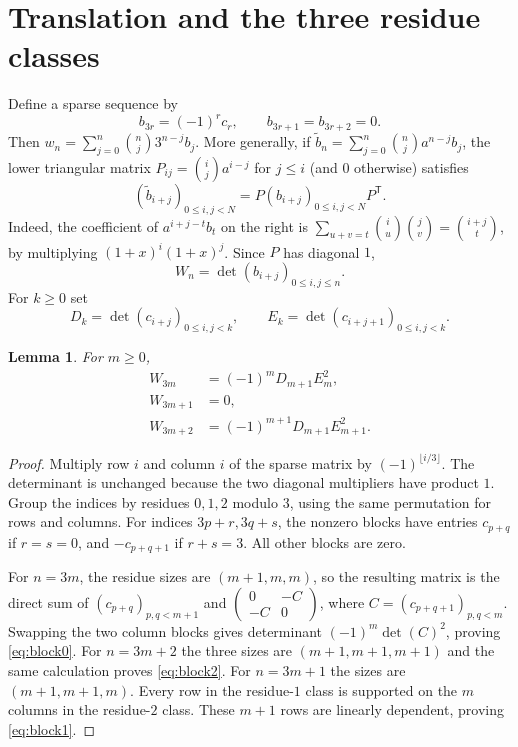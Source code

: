 \documentclass[11pt]{article}
\newtheorem{lemma}[theorem]{Lemma}
\begin{document}
\section{Translation and the three residue classes}
Define a sparse sequence by
\[
 b_{3r}=(-1)^r c_r,\qquad b_{3r+1}=b_{3r+2}=0.
\]
Then $w_n=\sum_{j=0}^n\binom nj3^{n-j}b_j$.
More generally, if $\widetilde b_n=\sum_{j=0}^n\binom nj a^{n-j}b_j$,
the lower triangular matrix
$P_{ij}=\binom ij a^{i-j}$ for $j\leq i$ (and $0$ otherwise) satisfies
\[
 (\widetilde b_{i+j})_{0\leq i,j<N}
   =P(b_{i+j})_{0\leq i,j<N}P^{\mathsf T}.
\]
Indeed, the coefficient of $a^{i+j-t}b_t$ on the right is
$\sum_{u+v=t}\binom iu\binom jv=\binom{i+j}t$, by multiplying
$(1+x)^i(1+x)^j$. Since $P$ has diagonal $1$,
\begin{equation}\label{eq:translate}
 W_n=\det(b_{i+j})_{0\leq i,j\leq n}.
\end{equation}
For $k\geq0$ set
\[
 D_k=\det(c_{i+j})_{0\leq i,j<k},\qquad
 E_k=\det(c_{i+j+1})_{0\leq i,j<k}.
\]
\begin{lemma}\label{lem:blocks}
For $m\geq0$,
\begin{align}
 W_{3m}&=(-1)^mD_{m+1}E_m^2,\label{eq:block0}\\
 W_{3m+1}&=0,\label{eq:block1}\\
 W_{3m+2}&=(-1)^{m+1}D_{m+1}E_{m+1}^2.\label{eq:block2}
\end{align}
\end{lemma}
\begin{proof}
Multiply row $i$ and column $i$ of the sparse matrix by
$(-1)^{\lfloor i/3\rfloor}$. The determinant is unchanged because the two
diagonal multipliers have product $1$. Group the indices by residues
$0,1,2$ modulo $3$, using the same permutation for rows and columns.
For indices $3p+r,3q+s$, the nonzero blocks have entries $c_{p+q}$ if
$r=s=0$, and $-c_{p+q+1}$ if $r+s=3$. All other blocks are zero.

For $n=3m$, the residue sizes are $(m+1,m,m)$, so the resulting matrix is
the direct sum of $(c_{p+q})_{p,q<m+1}$ and
$\left(\begin{smallmatrix}0&-C\\-C&0\end{smallmatrix}\right)$,
where $C=(c_{p+q+1})_{p,q<m}$. Swapping the two column blocks gives
determinant $(-1)^m\det(C)^2$, proving \eqref{eq:block0}.
For $n=3m+2$ the three sizes are $(m+1,m+1,m+1)$ and the same calculation
proves \eqref{eq:block2}.
For $n=3m+1$ the sizes are $(m+1,m+1,m)$. Every row in the residue-$1$
class is supported on the $m$ columns in the residue-$2$ class. These
$m+1$ rows are linearly dependent, proving \eqref{eq:block1}.
\end{proof}
\end{document}
